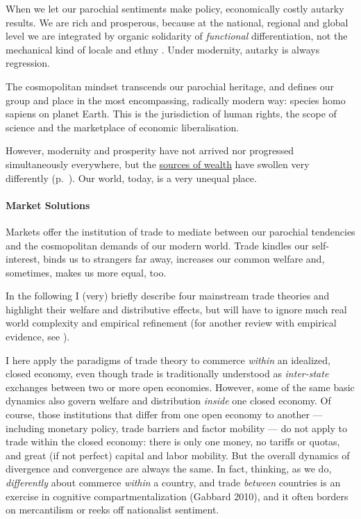 When we let our parochial sentiments make policy, economically costly autarky results.
We are rich and prosperous, because at the national, regional and global level we are integrated by organic solidarity of \emph{functional} differentiation, not the mechanical kind of locale and ethny \citep{Durkheim-1893-aa}.
Under modernity, autarky is always regression.

The cosmopolitan mindset transcends our parochial heritage, and defines our group and place in the most encompassing, radically modern way:
species homo sapiens on planet Earth.
This is the jurisdiction of human rights, the scope of science and the marketplace of economic liberalisation.

However, modernity and prosperity have not arrived nor progressed simultaneously everywhere, but the  \hyperref[sec:sources-of-wealth]{sources of wealth} have swollen very differently (p.~\pageref{sec:sources-of-wealth}).
Our world, today, is a very unequal place.

\paragraph{Market Solutions}  \label{sec:trade} Markets offer the institution of trade to mediate between our parochial tendencies and the cosmopolitan demands of our modern world.
Trade kindles our self-interest, binds us to strangers far away, increases our common welfare and, sometimes, makes us more equal, too.

In the following I (very) briefly describe four mainstream trade theories and highlight their welfare and distributive effects, but will have to ignore much real world complexity and empirical refinement (for another review with empirical evidence, see \citealt{Beckfield2009}).

I here apply the paradigms of trade theory to commerce \emph{within} an idealized, closed economy, even though trade is traditionally understood as \emph{inter-state} exchanges between two or more open economies.
However, some of the same basic dynamics also govern welfare and distribution \emph{inside} one closed economy.
Of course, those institutions that differ from one open economy to another --- including monetary policy, trade barriers and factor mobility --- do not apply to trade within the closed economy:
there is only one money, no tariffs or quotas, and great (if not perfect) capital and labor mobility.
But the overall dynamics of divergence and convergence are always the same.
In fact, thinking, as we do, \emph{differently} about commerce \emph{within} a country, and trade \emph{between} countries is an exercise in cognitive compartmentalization (Gabbard 2010), and it often borders on mercantilism or reeks off nationalist sentiment.


